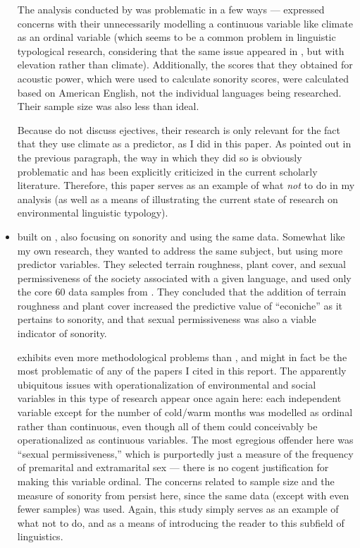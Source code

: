 \documentclass{article}
\begin{document}
\begin{itemize}
The analysis conducted by \textcite{fought2004} was problematic in a few ways --- \textcite{haynie2014} expressed concerns with their unnecessarily modelling a continuous variable like climate as an ordinal variable (which seems to be a common problem in linguistic typological research, considering that the same issue appeared in \cite{everett2013}, but with elevation rather than climate). Additionally, the scores that they obtained for acoustic power, which were used to calculate sonority scores, were calculated based on American English, not the individual languages being researched. Their sample size was also less than ideal.

Because \textcite{fought2004} do not discuss ejectives, their research is only relevant for the fact that they use climate as a predictor, as I did in this paper. As pointed out in the previous paragraph, the way in which they did so is obviously problematic and has been explicitly criticized in the current scholarly literature. Therefore, this paper serves as an example of what \emph{not} to do in my analysis (as well as a means of illustrating the current state of research on environmental linguistic typology). 

\item \textbf{}

\textcite{ember2007} built on \textcite{fought2004}, also focusing on sonority and using the same data. Somewhat like my own research, they wanted to address the same subject, but using more predictor variables. They selected terrain roughness, plant cover, and sexual permissiveness of the society associated with a given language, and used only the core 60 data samples from \textcite{fought2004}. They concluded that the addition of terrain roughness and plant cover increased the predictive value of ``econiche'' as it pertains to sonority, and that sexual permissiveness was also a viable indicator of sonority.

\textcite{ember2007} exhibits even more methodological problems than \textcite{fought2004}, and might in fact be the most problematic of any of the papers I cited in this report. The apparently ubiquitous issues with operationalization of environmental and social variables in this type of research appear once again here: each independent variable except for the number of cold/warm months was modelled as ordinal rather than continuous, even though all of them could conceivably be operationalized as continuous variables. The most egregious offender here was ``sexual permissiveness,'' which is purportedly just a measure of the frequency of premarital and extramarital sex --- there is no cogent justification for making this variable ordinal. The concerns related to sample size and the measure of sonority from \textcite{fought2004} persist here, since the same data (except with even fewer samples) was used. Again, this study simply serves as an example of what not to do, and as a means of introducing the reader to this subfield of linguistics.
  
\end{itemize}
\end{document}
